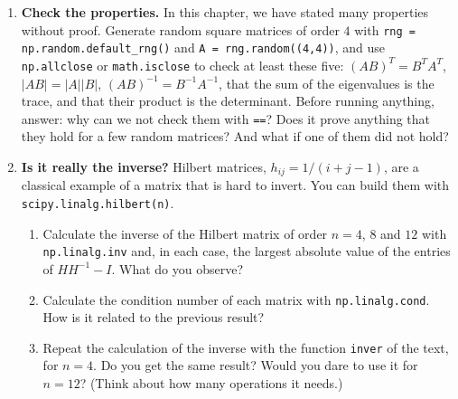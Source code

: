 \begin{enumerate}
\begin{verbatim}
def producto(X, Y):
    n, m = X.shape
    m2, l = Y.shape
    P = np.zeros((n, l))
    for i in range(n):
        for j in range(l):
            for k in range(n):
                P[i, j] = P[i, j] + X[i, k]*Y[k, j]
    return P
\end{verbatim}
\begin{enumerate}
\item Test it with $X$ of dimensions $2\times 3$ and $Y$ of dimensions $3\times 2$, and then with $Y$ times $X$. What happens in each case?
\item Find the bug and fix it.
\item Why did its authors not detect it? Which test cases should they have used? Write three checks with \texttt{assert} and \texttt{np.allclose} that would have caught it.
\end{enumerate}

\item \textbf{Check the properties.} In this chapter, we have stated many properties without proof. Generate random square matrices of order $4$ with \texttt{rng = np.random.default_rng()} and \texttt{A = rng.random((4,4))}, and use \texttt{np.allclose} or \texttt{math.isclose} to check at least these five: $(AB)^T=B^TA^T$, $\vert AB\vert=\vert A\vert \vert B\vert$, $(AB)^{-1}=B^{-1}A^{-1}$, that the sum of the eigenvalues is the trace, and that their product is the determinant. Before running anything, answer: why can we not check them with \texttt{==}? Does it prove anything that they hold for a few random matrices? And what if one of them did not hold?

\item \textbf{Is it really the inverse?} Hilbert matrices, $h_{ij}=1/(i+j-1)$, are a classical example of a matrix that is hard to invert. You can build them with \texttt{scipy.linalg.hilbert(n)}.
\begin{enumerate}
\item Calculate the inverse of the Hilbert matrix of order $n=4$, $8$ and $12$ with \texttt{np.linalg.inv} and, in each case, the largest absolute value of the entries of $HH^{-1}-I$. What do you observe?
\item Calculate the condition number of each matrix with \texttt{np.linalg.cond}. How is it related to the previous result?
\item Repeat the calculation of the inverse with the function \texttt{inver} of the text, for $n=4$. Do you get the same result? Would you dare to use it for $n=12$? (Think about how many operations it needs.)
\end{enumerate}


\end{enumerate}
